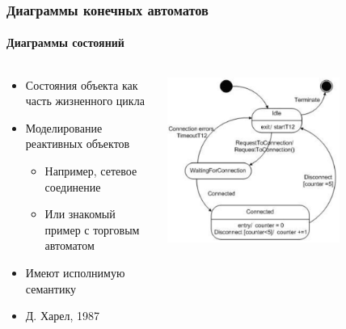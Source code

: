 \documentclass[xetex,mathserif,serif]{beamer}
\begin{document}
    \begin{frame}
        \frametitle{Диаграммы конечных автоматов}
        \framesubtitle{Диаграммы состояний}
        \begin{columns}
            \begin{column}{0.5\textwidth}
                \begin{itemize}
                    \item Состояния объекта как часть жизненного цикла
                    \item Моделирование реактивных объектов
                    \begin{itemize}
                        \item Например, сетевое соединение
                        \item Или знакомый пример с торговым автоматом
                    \end{itemize}
                    \item Имеют исполнимую семантику
                    \item Д. Харел, 1987
                \end{itemize}
            \end{column}
            \begin{column}{0.5\textwidth}
                \begin{center}
                    \includegraphics[width=0.7\textwidth]{stateTransitionExample.png}
                \end{center}
            \end{column}
        \end{columns}
    \end{frame}
\end{document}
